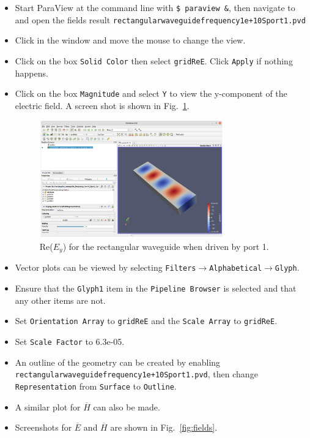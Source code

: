 \documentclass[titlepage]{article}
\renewcommand\_{\textunderscore\linebreak[1]}
\begin{document}
\begin{itemize}
\item Start ParaView at the command line with \verb+$ paraview &+, then navigate to and open the fields result \newline \texttt{rectangular\_waveguide\_frequency\_1e+10\_Sport\_1.pvd}
\item Click in the window and move the mouse to change the view.
\item Click on the box \texttt{Solid Color} then select \texttt{gridReE}.  Click \texttt{Apply} if nothing happens.
\item Click on the box \texttt{Magnitude} and select \texttt{Y} to view the y-component of the electric field.  A screen shot is shown in Fig.~\ref{fig:ReEy}.
\begin{figure}[H]
  \centering
  \includegraphics[width=0.75\textwidth]{../tutorials/OpenParEM3D/rectangular_waveguide/screenshots/ReEy}
  \caption{Re($E_y$) for the rectangular waveguide when driven by port 1.}
  \label{fig:ReEy}
\end{figure}
\item Vector plots can be viewed by selecting \texttt{Filters}$\rightarrow$\texttt{Alphabetical}$\rightarrow$\texttt{Glyph}.
\item Ensure that the \texttt{Glyph1} item in the \texttt{Pipeline Browser} is selected and that any other items are not.
\item Set \texttt{Orientation Array} to \texttt{gridReE} and the \texttt{Scale Array} to \texttt{gridReE}.
\item Set \texttt{Scale Factor} to 6.3e-05.
\item An outline of the geometry can be created by enabling \texttt{rectangular\_waveguide\_frequency\_1e+10\_Sport\_1.pvd}, then change \texttt{Representation} from \texttt{Surface} to \texttt{Outline}.
\item A similar plot for $\overline{H}$ can also be made.
\item Screenshots for $\overline{E}$ and $\overline{H}$ are shown in Fig.~\ref{fig:fields}.

\end{itemize}
\end{document}
